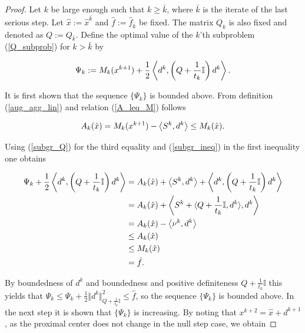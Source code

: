 \begin{proof}
	Let \(k\) be large enough such that \(k \geq \bar{k}\), where \(\bar{k}\) is the iterate of the last serious step. Let \(\hat{x}:= \hat{x}^{\bar{k}} \) and \(\hat{f}:= \hat{f}_{\bar{k}}\) be fixed. The matrix \(Q_k\) is also fixed and denoted as \(Q := Q_{\bar{k}}\).
	Define the optimal value of the \(k\)'th subproblem  (\ref{Q_subprob}) for \(k > \bar{k}\) by 
	
	\begin{equation}
		\Psi_k := M_k(x^{k+1})+\frac{1}{2}\left\langle d^k,\left(Q+\frac{1}{t_k}\mathbb{I}\right)d^k\right\rangle.
		\label{Psi}
	\end{equation}
	
	It is first shown that the sequence \(\{\Psi_k\}\) is bounded above.
	From definition (\ref{aug_agg_lin}) and relation (\ref{A_leq_M}) follows

	
	\begin{equation*}
		A_k(\hat{x}) = M_k(x^{k+1})-\left\langle S^k,d^k \right\rangle \leq M_k(\hat{x}).
	\end{equation*}
	
Using (\ref{subgr_Q}) for the third equality and (\ref{subgr_ineq}) in the first inequality one obtains
	
	\begin{align*}
		\Psi_k+\frac{1}{2}\left\langle d^{k},\left(Q+\frac{1}{t_k}\mathbb{I}\right)d^k\right\rangle &= A_k(\hat{x})+\left\langle S^k,d^k\right\rangle + \left\langle d^{k},\left(Q+\frac{1}{t_k}\mathbb{I}\right)d^k\right\rangle \\
		&= A_k(\hat{x}) + \left\langle S^k + \langle Q+\frac{1}{t_k}\mathbb{I},d^k \rangle,d^k \right\rangle \\
		&= A_k(\hat{x})-\left\langle \nu^k,d^k \right\rangle \\
		&\leq A_k(\hat{x}) \\
		&\leq M_k(\hat{x}) \\
		&= \hat{f}.
	\end{align*}
	
By boundedness of \(d^k\) and boundedness and positive definiteness \(Q+\frac{1}{t_k}\mathbb{I}\) this yields that \(\Psi_k \leq \Psi_k + \frac{1}{2} \Vert d^k\Vert^2_{Q+\frac{1}{t_k}\mathbb{I}} \leq \hat{f}\), so the sequence \(\{\Psi_k\}\) is bounded above.
	In the next step it is shown that \(\{\Psi_k\}\) is increasing. By noting that \(x^{k+2} = \hat{x}+d^{k+1}\), as the proximal center does not change in the null step case, we obtain
	

\end{proof}
